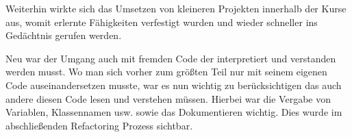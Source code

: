 Weiterhin wirkte  sich das Umsetzen von kleineren Projekten innerhalb der Kurse aus, womit erlernte Fähigkeiten  verfestigt wurden und wieder schneller ins Gedächtnis gerufen werden.%


Neu war der Umgang auch mit fremden Code der interpretiert und verstanden werden musst. Wo man sich vorher zum größten Teil nur mit seinem eigenen Code auseinandersetzen musste, war es nun wichtig zu berücksichtigen das auch andere diesen Code lesen und verstehen müssen. Hierbei war die Vergabe von Variablen, Klassennamen usw. sowie das Dokumentieren wichtig. Dies wurde im abschließenden Refactoring Prozess sichtbar.







